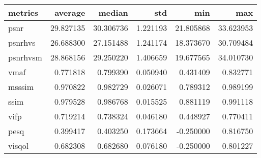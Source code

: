 \begin{tabular}{lrrrrr}
\toprule
metrics & average & median & std & min & max \\
\midrule
psnr & 29.827135 & 30.306736 & 1.221193 & 21.805868 & 33.623953 \\
psnrhvs & 26.688300 & 27.151488 & 1.241174 & 18.373670 & 30.709484 \\
psnrhvsm & 28.868156 & 29.250220 & 1.406659 & 19.677565 & 34.010730 \\
vmaf & 0.771818 & 0.799390 & 0.050940 & 0.431409 & 0.832771 \\
msssim & 0.970822 & 0.982729 & 0.026071 & 0.789312 & 0.989199 \\
ssim & 0.979528 & 0.986768 & 0.015525 & 0.881119 & 0.991118 \\
vifp & 0.719214 & 0.738324 & 0.046180 & 0.448927 & 0.770411 \\
pesq & 0.399417 & 0.403250 & 0.173664 & -0.250000 & 0.816750 \\
visqol & 0.682308 & 0.682680 & 0.076180 & -0.250000 & 0.801227 \\
\bottomrule
\end{tabular}

